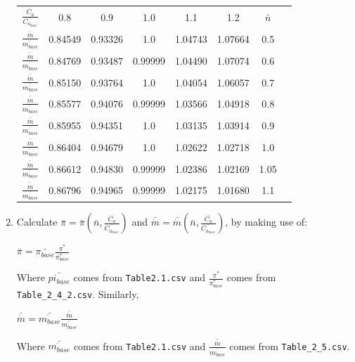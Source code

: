 \documentclass[12pt,english]{article}
\begin{document}
\begin{enumerate}
    \begin{center}
        \begin{tabular}{ c c c c c c c c }
            $\frac{\bar{C_{a}}}{\bar{C_{a_{base}}}}$ & 0.8 & 0.9 & 1.0 & 1.1 & 1.2 & $\bar{n}$ \\
            $\frac{\bar{\dot{m}}}{\bar{\dot{m_{base}}}}$ & 0.84549 & 0.93326 & 1.0 & 1.04743 & 1.07664 & 0.5 \\
            $\frac{\bar{\dot{m}}}{\bar{\dot{m_{base}}}}$ & 0.84769 & 0.93487 & 0.99999 & 1.04490 & 1.07074 & 0.6 \\
            $\frac{\bar{\dot{m}}}{\bar{\dot{m_{base}}}}$ & 0.85150 & 0.93764 & 1.0 & 1.04054 & 1.06057 & 0.7 \\
            $\frac{\bar{\dot{m}}}{\bar{\dot{m_{base}}}}$ & 0.85577 & 0.94076 & 0.99999 & 1.03566 & 1.04918 & 0.8 \\
            $\frac{\bar{\dot{m}}}{\bar{\dot{m_{base}}}}$ & 0.85955 & 0.94351 & 1.0 & 1.03135 & 1.03914 & 0.9 \\
            $\frac{\bar{\dot{m}}}{\bar{\dot{m_{base}}}}$ & 0.86404 & 0.94679 & 1.0 & 1.02622 & 1.02718 & 1.0 \\
            $\frac{\bar{\dot{m}}}{\bar{\dot{m_{base}}}}$ & 0.86612 & 0.94830 & 0.99999 & 1.02386 & 1.02169 & 1.05 \\
            $\frac{\bar{\dot{m}}}{\bar{\dot{m_{base}}}}$ & 0.86796 & 0.94965 & 0.99999 & 1.02175 & 1.01680 & 1.1 \\
        \end{tabular}
    \end{center}

    \item Calculate $\bar{\pi} = \bar{\pi} (\bar{n}, \frac{\bar{C_{a}}}{\bar{C_{a_{base}}}})$ and $\bar{\dot{m}} = \bar{\dot{m}} (\bar{n}, \frac{\bar{C_{a}}}{\bar{C_{a_{base}}}})$, by making use of:
    \begin{center}
        $\bar{\pi} = \bar{\pi_{base}} \frac{\pi^{*}}{\pi^{*}_{base}}$
    \end{center}

    Where $\bar{pi_{base}}$ comes from \verb|Table2.1.csv| and $\frac{\pi^{*}}{\pi^{*}_{base}}$ comes from \verb|Table_2_4_2.csv|. Similarly,
    \begin{center}
        $\bar{\dot{m}} = \bar{\dot{m_{base}}} \frac{\bar{\dot{m}}}{\bar{\dot{m_{base}}}}$
    \end{center}

    Where $\bar{\dot{m_{base}}}$ comes from \verb|Table2.1.csv| and $\frac{\bar{\dot{m}}}{\bar{\dot{m_{base}}}}$ comes from \verb|Table_2_5.csv|. 


\end{enumerate}
\end{document}
